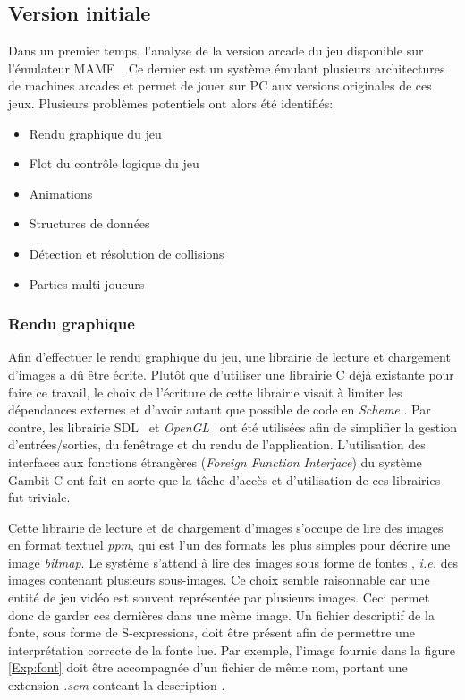 \documentclass[12pt,twoside,letterpaper,francais]{book}
\newcommand{\ie}{{\textit{i.e. }}}
\newcommand{\Schemelang}{{\textit{Scheme }}}
\newcommand{\scheme}[1]{\selectlanguage{english}{\tt #1}\selectlanguage{french}}
\begin{document}
\FloatBarrier
\subsection{Version initiale} \label{Exp:sp1}
Dans un premier temps, l'analyse de la version arcade du jeu
disponible sur l'émulateur MAME~\cite{MAME}. Ce dernier est un système
émulant plusieurs architectures de machines arcades et permet de jouer
sur PC aux versions originales de ces jeux. Plusieurs problèmes
potentiels ont alors été identifiés:

\begin{itemize}
\item Rendu graphique du jeu
\item Flot du contrôle logique du jeu
\item Animations
\item Structures de données
\item Détection et résolution de collisions
\item Parties multi-joueurs
\end{itemize}


\FloatBarrier
\subsubsection{Rendu graphique}
Afin d'effectuer le rendu graphique du jeu, une librairie de lecture
et chargement d'images a dû être écrite. Plutôt que d'utiliser une
librairie C déjà existante pour faire ce travail, le choix de
l'écriture de cette librairie visait à limiter les dépendances
externes et d'avoir autant que possible de code en \Schemelang. Par
contre, les librairie SDL~\cite{SDL} et \textit{OpenGL}~\cite{OpenGL}
ont été utilisées afin de simplifier la gestion d'entrées/sorties, du
fenêtrage et du rendu de l'application. L'utilisation des interfaces
aux fonctions étrangères (\textit{Foreign Function Interface}) du
système Gambit-C ont fait en sorte que la tâche d'accès et
d'utilisation de ces librairies fut triviale.

Cette librairie de lecture et de chargement d'images s'occupe de lire
des images en format textuel \textit{ppm}, qui est l'un des formats
les plus simples pour décrire une image \textit{bitmap}. Le système
s'attend à lire des images sous forme de \og fontes \fg, \ie des
images contenant plusieurs sous-images. Ce choix semble raisonnable
car une entité de jeu vidéo est souvent représentée par plusieurs
images. Ceci permet donc de garder ces dernières dans une même
image. Un fichier descriptif de la fonte, sous forme de S-expressions,
doit être présent afin de permettre une interprétation correcte de la
fonte lue. Par exemple, l'image fournie dans la figure \ref{Exp:font}
doit être accompagnée d'un fichier de même nom, portant une extension
\emph{.scm} conteant la description \scheme{((colors: (white green
  red)) (chars: (0 1)))}.
\end{document}
